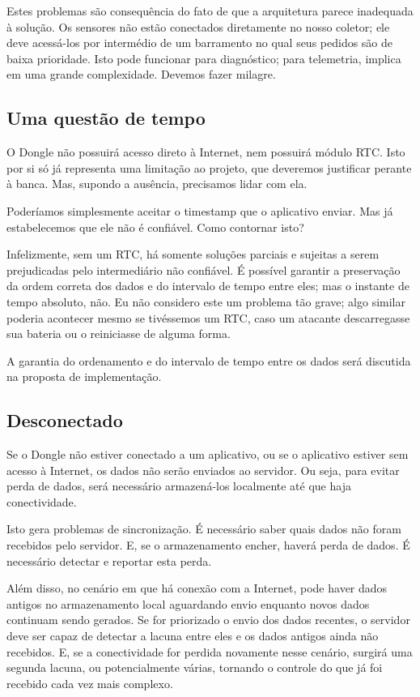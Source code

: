 \documentclass[12pt]{article}
\begin{document}
Estes problemas são consequência do fato de que a arquitetura parece inadequada à solução. Os sensores não estão conectados diretamente no nosso coletor; ele deve acessá-los por intermédio de um barramento no qual seus pedidos são de baixa prioridade. Isto pode funcionar para diagnóstico; para telemetria, implica em uma grande complexidade. Devemos fazer milagre.

\subsection{Uma questão de tempo} \label{questaodetempo}

O Dongle não possuirá acesso direto à Internet, nem possuirá módulo RTC. Isto por si só já representa uma limitação ao projeto, que deveremos justificar perante à banca. Mas, supondo a ausência, precisamos lidar com ela.

Poderíamos simplesmente aceitar o timestamp que o aplicativo enviar. Mas já estabelecemos que ele não é confiável. Como contornar isto?

Infelizmente, sem um RTC, há somente soluções parciais e sujeitas a serem prejudicadas pelo intermediário não confiável. É possível garantir a preservação da ordem correta dos dados e do intervalo de tempo entre eles; mas o instante de tempo absoluto, não. Eu não considero este um problema tão grave; algo similar poderia acontecer mesmo se tivéssemos um RTC, caso um atacante descarregasse sua bateria ou o reiniciasse de alguma forma. 

A garantia do ordenamento e do intervalo de tempo entre os dados será discutida na proposta de implementação.

\subsection{Desconectado} \label{conectividade}

Se o Dongle não estiver conectado a um aplicativo, ou se o aplicativo estiver sem acesso à Internet, os dados não serão enviados ao servidor. Ou seja, para evitar perda de dados, será necessário armazená-los localmente até que haja conectividade.

Isto gera problemas de sincronização. É necessário saber quais dados não foram recebidos pelo servidor. E, se o armazenamento encher, haverá perda de dados. É necessário detectar e reportar esta perda.

Além disso, no cenário em que há conexão com a Internet, pode haver dados antigos no armazenamento local aguardando envio enquanto novos dados continuam sendo gerados. Se for priorizado o envio dos dados recentes, o servidor deve ser capaz de detectar a lacuna entre eles e os dados antigos ainda não recebidos. E, se a conectividade for perdida novamente nesse cenário, surgirá uma segunda lacuna, ou potencialmente várias, tornando o controle do que já foi recebido cada vez mais complexo.
\end{document}
